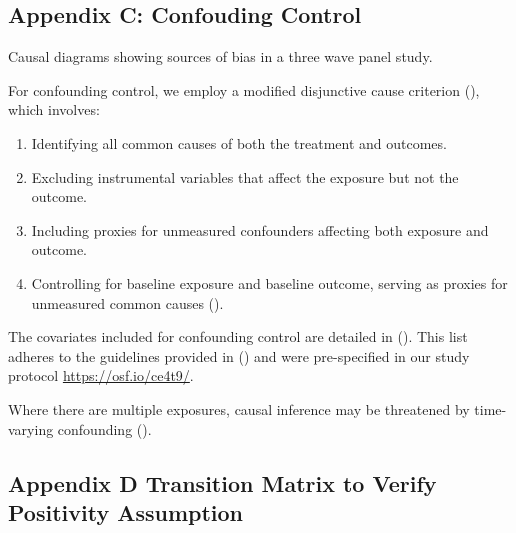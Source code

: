 \documentclass[
  single column]{article}
\providecommand{\tightlist}{%
  \setlength{\itemsep}{0pt}\setlength{\parskip}{0pt}}\usepackage{longtable,booktabs,array}
\begin{document}
\begin{longtable}[t]{lll}
\end{longtable}

\endgroup{}
\endgroup{}

\newpage{}

\subsection{Appendix C: Confouding
Control}\label{appendix-c-confouding-control}

\begin{table}

\caption{\label{tbl-02}Causal diagrams showing sources of bias in a
three wave panel study.}

\centering{

\tvtable

}

\end{table}%

For confounding control, we employ a modified disjunctive cause
criterion (), which
involves:

\begin{enumerate}
\def\labelenumi{\arabic{enumi}.}
\tightlist
\item
  Identifying all common causes of both the treatment and outcomes.
\item
  Excluding instrumental variables that affect the exposure but not the
  outcome.
\item
  Including proxies for unmeasured confounders affecting both exposure
  and outcome.
\item
  Controlling for baseline exposure and baseline outcome, serving as
  proxies for unmeasured common causes
  ().
\end{enumerate}

The covariates included for confounding control are detailed in
(). This list
adheres to the guidelines provided in
() and were
pre-specified in our study protocol \url{https://osf.io/ce4t9/}.

Where there are multiple exposures, causal inference may be threatened
by time-varying confounding
().

\newpage{}

\subsection{Appendix D Transition Matrix to Verify Positivity
Assumption}\label{appendix-transition}
\end{document}
